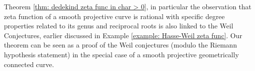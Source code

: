 \documentclass[11pt, x11names, openany]{book}
\newcommand{\nocontentsline}[3]{}
\newcommand{\tocless}[2]{\bgroup\let\addcontentsline=\nocontentsline#1{#2}\egroup}
\begin{document}
\begin{remark}
Theorem \ref{thm: dedekind zeta func in char > 0}, in particular the observation that zeta function of a smooth projective curve is rational with specific degree properties related to its genus and reciprocal roots is also linked to the Weil Conjectures, earlier discussed in Example \ref{example: Hasse-Weil zeta func}. Our theorem can be seen as a proof of the Weil conjectures (modulo the Riemann hypothesis statement) in the special case of a smooth projective geometrically connected curve.
\end{remark}














\end{document}
